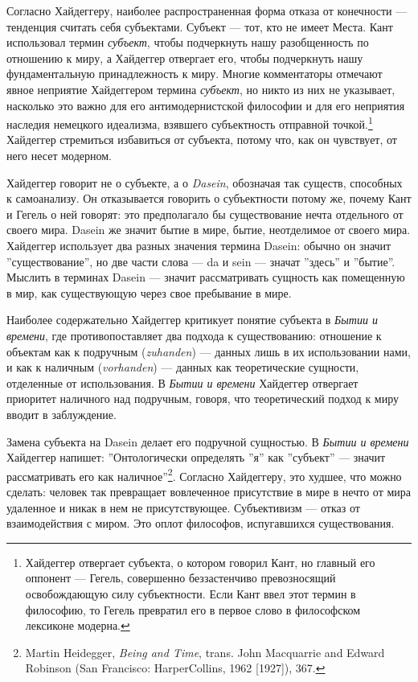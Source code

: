 \documentclass[12pt]{book}
\begin{document}
Согласно Хайдеггеру, наиболее распространенная форма отказа от конечности --- тенденция считать себя субъектами. Субъект --- тот, кто не имеет Места. Кант использовал термин \textit{субъект}, чтобы подчеркнуть нашу разобщенность по отношению к миру, а Хайдеггер отвергает его, чтобы подчеркнуть нашу фундаментальную принадлежность к миру. Многие комментаторы отмечают явное неприятие Хайдеггером термина \textit{субъект}, но никто из них не указывает, насколько это важно для его антимодернистской философии и для его неприятия наследия немецкого идеализма, взявшего субъектность отправной точкой.\footnote{Хайдеггер отвергает субъекта, о котором говорил Кант, но главный его оппонент --- Гегель, совершенно беззастенчиво превозносящий освобождающую силу субъектности. Если Кант ввел этот термин в философию, то Гегель превратил его в первое слово в философском лексиконе модерна.} Хайдеггер стремиться избавиться от субъекта, потому что, как он чувствует, от него несет модерном.

Хайдеггер говорит не о субъекте, а о \textit{Dasein}, обозначая так существ, способных к самоанализу. Он отказывается говорить о субъектности потому же, почему Кант и Гегель о ней говорят: это предполагало бы существование нечта отдельного от своего мира. Dasein же значит бытие в мире, бытие, неотделимое от своего мира. Хайдеггер использует два разных значения термина Dasein: обычно он значит ''существование'', но две части слова --- da и sein --- значат ''здесь'' и ''бытие''. Мыслить в терминах Dasein --- значит рассматривать сущность как помещенную в мир, как существующую через свое пребывание в мире.

Наиболее содержательно Хайдеггер критикует понятие субъекта в \textit{Бытии и времени}, где противопоставляет два подхода к существованию: отношение к объектам как к подручным (\textit{zuhanden}) --- данных лишь в их использовании нами, и как к наличным (\textit{vorhanden}) --- данных как теоретические сущности, отделенные от использования. В \textit{Бытии и времени} Хайдеггер отвергает приоритет наличного над подручным, говоря, что теоретический подход к миру вводит в заблуждение.

Замена субъекта на Dasein делает его подручной сущностью. В \textit{Бытии и времени} Хайдеггер напишет: ''Онтологически определять ''я'' как ''субъект'' --- значит рассматривать его как наличное''\footnote{Martin Heidegger, \textit{Being and Time}, trans. John Macquarrie and Edward Robinson (San Francisco: HarperCollins, 1962 [1927]), 367.}. Согласно Хайдеггеру, это худшее, что можно сделать: человек так превращает вовлеченное присутствие в мире в нечто от мира удаленное и никак в нем не присутствующее. Субъективизм --- отказ от взаимодействия с миром. Это оплот философов, испугавшихся существования.
\end{document}
